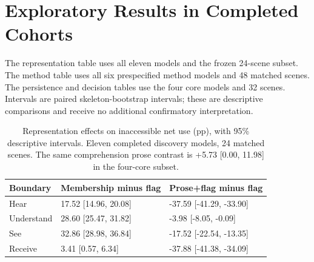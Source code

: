 \section{Exploratory Results in Completed Cohorts}
\label{app:explore}
The representation table uses all eleven models and the frozen 24-scene subset. The method table uses all six prespecified method models and 48 matched scenes. The persistence and decision tables use the four core models and 32 scenes. Intervals are paired skeleton-bootstrap intervals; these are descriptive comparisons and receive no additional confirmatory interpretation.
\begin{table}[t]
\centering\small
\begin{lrbox}{\OCtable}\begin{tabular}{@{}lll@{}}
\toprule
Boundary & Membership minus flag & Prose+flag minus flag\\
\midrule
Hear & 17.52 [14.96, 20.08] & -37.59 [-41.29, -33.90]\\
Understand & 28.60 [25.47, 31.82] & -3.98 [-8.05, -0.09]\\
See & 32.86 [28.98, 36.84] & -17.52 [-22.54, -13.35]\\
Receive & 3.41 [0.57, 6.34] & -37.88 [-41.38, -34.09]\\
\bottomrule
\end{tabular}\end{lrbox}
\ifdim\wd\OCtable>\linewidth\PackageError{access-paper}{Table tab:representation exceeds its column}{Revise the table layout.}\fi
\usebox{\OCtable}
\caption{Representation effects on inaccessible net use (pp), with 95\% descriptive intervals. Eleven completed discovery models, 24 matched scenes. The same comprehension prose contrast is +5.73 [0.00, 11.98] in the four-core subset.}
\label{tab:representation}
\end{table}
